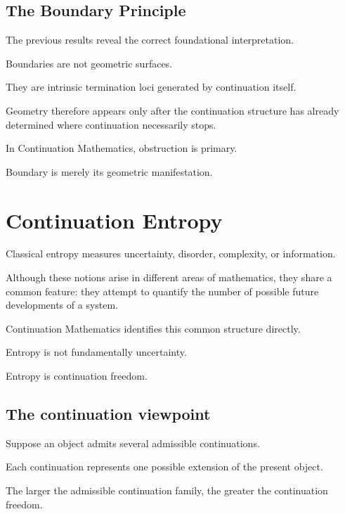 \documentclass[13pt,openany]{book}
\theoremstyle{plain}
\theoremstyle{definition}
\begin{document}
\section{The Boundary Principle}

The previous results reveal the correct foundational interpretation.

Boundaries are not geometric surfaces.

They are intrinsic termination loci generated by continuation itself.

Geometry therefore appears only after the continuation structure has already determined where continuation necessarily stops.

In Continuation Mathematics, obstruction is primary.

Boundary is merely its geometric manifestation.

\chapter{Continuation Entropy}

Classical entropy measures uncertainty, disorder, complexity, or information.

Although these notions arise in different areas of mathematics, they share a common feature: they attempt to quantify the number of possible future developments of a system.

Continuation Mathematics identifies this common structure directly.

Entropy is not fundamentally uncertainty.

Entropy is continuation freedom.

\section{The continuation viewpoint}

Suppose an object admits several admissible continuations.

Each continuation represents one possible extension of the present object.

The larger the admissible continuation family, the greater the continuation freedom.
\end{document}

